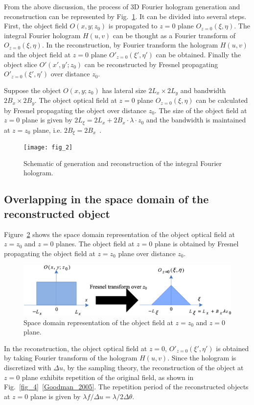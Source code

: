 \documentclass[10pt,letterpaper]{article}
\begin{document}
From the above discussion, the process of 3D Fourier hologram generation and reconstruction can be represented by Fig.~\ref{fig_process}. It can be divided into several steps. First, the object field $O(x, y; z_0)$ is propagated to $z=0$ plane $O_{z=0}(\xi, \eta)$. The integral Fourier hologram $H(u, v)$ can be thought as a Fourier transform of $O_{z=0}(\xi, \eta)$. In the reconstruction, by Fourier transform the hologram $H(u, v)$ and the object field at $z=0$ plane $O'_{z=0}(\xi', \eta')$ can be obtained. Finally the object slice $O'(x', y'; z_0)$ can be reconstructed by Fresnel propagating $O'_{z=0}(\xi', \eta')$ over distance $z_0$.

Suppose the object $O(x,y;z_0)$ has lateral size $2L_x \times 2L_y$ and bandwidth $2B_x\times2B_y$. The object optical field at $z=0$ plane $O_{z=0}(\xi, \eta)$ can be calculated by Fresnel propagating the object over distance $z_0$. The size of the object field at $z=0$ plane is given by $2L_\xi=2L_x+2B_x \cdot\lambda\cdot z_0$ and the bandwidth is maintained at $z=z_0$ plane, i.e. $2B_\xi=2B_x$~\cite{Stern_2006_JOSA,Stern_2004_JOSA}. 

\begin{figure}[htbp]
\centering
\texttt{[image: fig\_2]}
\caption{Schematic of generation and reconstruction of the integral Fourier hologram.}
\label{fig_process}
\end{figure}

\subsection{Overlapping in the space domain of the reconstructed object} 
Figure~\ref{fig_3} shows the space domain representation of the object optical field at $z=z_0$ and $z=0$ planes. The object field at $z=0$ plane is obtained by Fresnel propagating the object field at $z=z_0$ plane over distance $z_0$.
\begin{figure}[htbp]
\centering\includegraphics[width=.55\columnwidth]{fig_3}
\caption{Space domain representation of the object field at $z=z_0$ and $z=0$ plane.}
\label{fig_3}
\end{figure}

In the reconstruction, the object optical field at $z=0$, $O'_{z=0}(\xi', \eta')$ is obtained by taking Fourier transform of the hologram $H(u,v)$. Since the hologram is discretized with $\Delta u$, by the sampling theory, the reconstruction of the object at $z=0$ plane exhibits repetition of the original field, as shown in Fig.~\ref{fig_4}~\ref{Goodman_2005}. The repetition period of the reconstructed objects at $z=0$ plane is given by $\lambda f/\Delta u=\lambda/2\Delta\theta$. 
\end{document}
